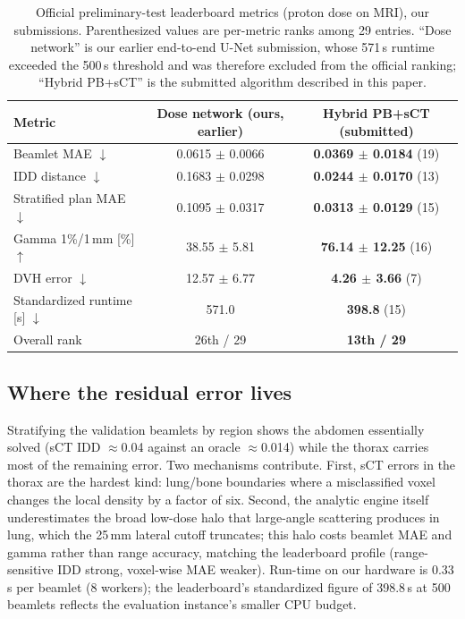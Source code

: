 \documentclass[runningheads]{llncs}
\begin{document}
\begin{table}[t]
\centering
\caption{Official preliminary-test leaderboard metrics (proton dose on MRI), our submissions. Parenthesized values are per-metric ranks among 29 entries. ``Dose network'' is our earlier end-to-end U-Net submission, whose 571\,s runtime exceeded the 500\,s threshold and was therefore excluded from the official ranking; ``Hybrid PB+sCT'' is the submitted algorithm described in this paper.}
\label{tab:lb}
\setlength{\tabcolsep}{4pt}
\begin{tabular}{lcc}
\toprule
Metric & Dose network (ours, earlier) & Hybrid PB+sCT (submitted)\\
\midrule
Beamlet MAE $\downarrow$ & 0.0615 $\pm$ 0.0066 & \textbf{0.0369 $\pm$ 0.0184} (19)\\
IDD distance $\downarrow$ & 0.1683 $\pm$ 0.0298 & \textbf{0.0244 $\pm$ 0.0170} (13)\\
Stratified plan MAE $\downarrow$ & 0.1095 $\pm$ 0.0317 & \textbf{0.0313 $\pm$ 0.0129} (15)\\
Gamma 1\%/1\,mm [\%] $\uparrow$ & 38.55 $\pm$ 5.81 & \textbf{76.14 $\pm$ 12.25} (16)\\
DVH error $\downarrow$ & 12.57 $\pm$ 6.77 & \textbf{4.26 $\pm$ 3.66} (7)\\
Standardized runtime [s] $\downarrow$ & 571.0 & \textbf{398.8} (15)\\
\midrule
Overall rank & 26th / 29 & \textbf{13th / 29}\\
\bottomrule
\end{tabular}
\end{table}

\subsection{Where the residual error lives}
Stratifying the validation beamlets by region shows the abdomen essentially solved (sCT IDD $\approx$0.04 against an oracle $\approx$0.014) while the thorax carries most of the remaining error. Two mechanisms contribute. First, sCT errors in the thorax are the hardest kind: lung/bone boundaries where a misclassified voxel changes the local density by a factor of six. Second, the analytic engine itself underestimates the broad low-dose halo that large-angle scattering produces in lung, which the 25\,mm lateral cutoff truncates; this halo costs beamlet MAE and gamma rather than range accuracy, matching the leaderboard profile (range-sensitive IDD strong, voxel-wise MAE weaker). Run-time on our hardware is 0.33\,s per beamlet (8 workers); the leaderboard's standardized figure of 398.8\,s at 500 beamlets reflects the evaluation instance's smaller CPU budget.
\end{document}
